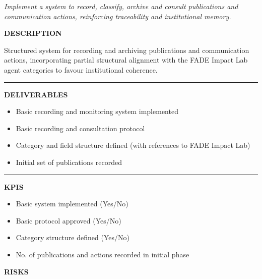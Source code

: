 \documentclass[11pt,a4paper]{scrreprt}
\newcommand{\fieldlabel}[1]{%
  {\footnotesize\sffamily\bfseries\color{mutedcolor}\MakeUppercase{#1}}\par\nopagebreak[4]
}
\newcommand{\fieldsep}{\vspace{3pt}\noindent\textcolor{bordercolor}{\rule{\linewidth}{0.4pt}}\vspace{3pt}\par}
\begin{document}
\vspace{8pt}

\newpage
{}
{\small\color{mutedcolor}\itshape Implement a system to record, classify, archive and consult publications and communication actions, reinforcing traceability and institutional memory.}\par\vspace{6pt}

\begin{tcolorbox}[pabox={comcolor}{A.P.3.1 \enspace\textbullet\enspace Implementation of the Recording, Archiving and Monitoring System for Publications and Communication Actions}]

\fieldlabel{Description}
{\small Structured system for recording and archiving publications and communication actions, incorporating partial structural alignment with the FADE Impact Lab agent categories to favour institutional coherence.}\par
\fieldsep
\fieldlabel{Deliverables}
{\small \begin{itemize}[noitemsep,topsep=2pt]
\item Basic recording and monitoring system implemented
\item Basic recording and consultation protocol
\item Category and field structure defined (with references to FADE Impact Lab)
\item Initial set of publications recorded
\end{itemize}}\par
\fieldsep
\fieldlabel{KPIs}
{\small \begin{itemize}[noitemsep,topsep=2pt]
\item Basic system implemented (Yes/No)
\item Basic protocol approved (Yes/No)
\item Category structure defined (Yes/No)
\item No. of publications and actions recorded in initial phase
\end{itemize}}\par
\end{tcolorbox}
\begin{tcolorbox}[riskbox]
{\footnotesize\sffamily\bfseries\color{red!50!black} RISKS}\par{}
\end{tcolorbox}
\end{document}

